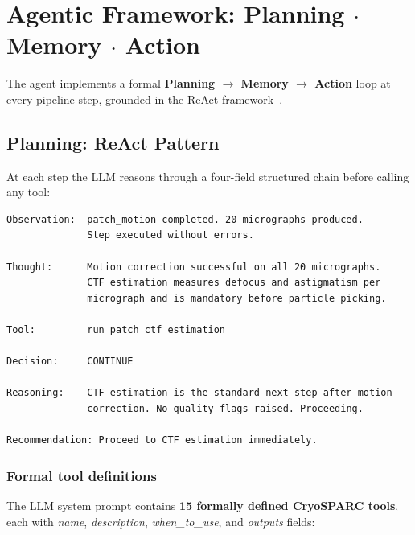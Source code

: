 \documentclass[12pt, a4paper]{article}
\begin{document}
\section{Agentic Framework: Planning \texorpdfstring{$\cdot$}{.} Memory \texorpdfstring{$\cdot$}{.} Action}
\label{sec:agent}

The agent implements a formal \textbf{Planning $\to$ Memory $\to$ Action}
loop at every pipeline step, grounded in the ReAct
framework~\cite{yao2023react}.

\subsection{Planning: ReAct Pattern}

At each step the LLM reasons through a four-field structured chain before
calling any tool:

\begin{tcolorbox}[
  colback=codebg, colframe=agentblue, arc=4pt, boxrule=0.8pt,
  title={\small\bfseries ReAct Reasoning Chain --- live example (step: patch\_ctf)}
]
\begin{lstlisting}[numbers=none, frame=none, backgroundcolor=\color{codebg}]
Observation:  patch_motion completed. 20 micrographs produced.
              Step executed without errors.

Thought:      Motion correction successful on all 20 micrographs.
              CTF estimation measures defocus and astigmatism per
              micrograph and is mandatory before particle picking.

Tool:         run_patch_ctf_estimation

Decision:     CONTINUE

Reasoning:    CTF estimation is the standard next step after motion
              correction. No quality flags raised. Proceeding.

Recommendation: Proceed to CTF estimation immediately.
\end{lstlisting}
\end{tcolorbox}

\subsubsection{Formal tool definitions}

The LLM system prompt contains \textbf{15 formally defined CryoSPARC tools},
each with \textit{name}, \textit{description}, \textit{when\_to\_use},
and \textit{outputs} fields:
\end{document}
